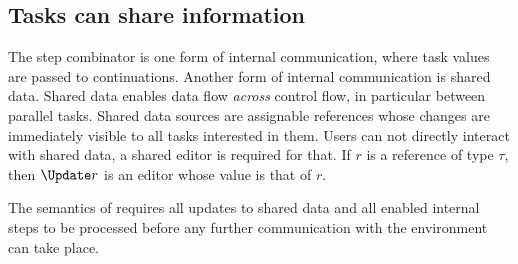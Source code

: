 \subsection{Tasks can share information}

The step combinator is one form of internal communication, where task values are passed to continuations.
Another form of internal communication is shared data.
Shared data enables data flow \emph{across} control flow, in particular between parallel tasks.
Shared data sources are assignable references whose changes are immediately visible to all tasks interested in them.
Users can not directly interact with shared data, a shared editor is required for that.
If $r$ is a reference of type $\tau$, then $\Update r$ is an editor whose value is that of $r$.

The semantics of \TOPHAT requires all updates to shared data and all enabled internal steps to be processed before any further communication with the environment can take place.


